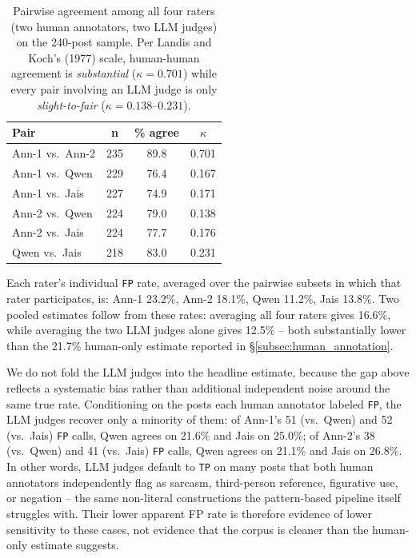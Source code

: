 \documentclass[letterpaper]{article} %
\begin{document}
\begin{table}[h]
\centering
\small
\begin{tabular}{lccc}
\toprule
\textbf{Pair} & \textbf{n} & \textbf{\% agree} & \textbf{$\kappa$} \\
\midrule
Ann-1 vs.\ Ann-2 & 235 & 89.8 & 0.701 \\
Ann-1 vs.\ Qwen & 229 & 76.4 & 0.167 \\
Ann-1 vs.\ Jais & 227 & 74.9 & 0.171 \\
Ann-2 vs.\ Qwen & 224 & 79.0 & 0.138 \\
Ann-2 vs.\ Jais & 224 & 77.7 & 0.176 \\
Qwen vs.\ Jais & 218 & 83.0 & 0.231 \\
\bottomrule
\end{tabular}
\caption{Pairwise agreement among all four raters (two human
annotators, two LLM judges) on the 240-post sample. Per Landis and
Koch's (1977) scale, human-human agreement is \emph{substantial}
($\kappa=0.701$) while every pair involving an LLM judge is only
\emph{slight-to-fair} ($\kappa = 0.138$--$0.231$).}
\label{tab:iaa_full}
\end{table}

Each rater's individual \texttt{FP} rate, averaged over the pairwise
subsets in which that rater participates, is: Ann-1 23.2\%, Ann-2 18.1\%,
Qwen 11.2\%, Jais 13.8\%. Two pooled estimates follow from these rates:
averaging all four raters gives 16.6\%, while averaging the two LLM
judges alone gives 12.5\% -- both substantially lower than the
21.7\% human-only estimate reported in
\S\ref{subsec:human_annotation}.

We do not fold the LLM judges into the headline estimate, because the
gap above reflects a systematic bias rather than additional independent
noise around the same true rate. Conditioning on the posts each human
annotator labeled \texttt{FP}, the LLM judges recover only a minority
of them: of Ann-1's 51 (vs.\ Qwen) and 52 (vs.\ Jais) \texttt{FP} calls,
Qwen agrees on 21.6\% and Jais on 25.0\%; of Ann-2's 38 (vs.\ Qwen) and
41 (vs.\ Jais) \texttt{FP} calls, Qwen agrees on 21.1\% and Jais on
26.8\%. In other words, LLM judges default to \texttt{TP} on many posts
that both human annotators independently flag as sarcasm, third-person
reference, figurative use, or negation -- the same non-literal
constructions the pattern-based pipeline itself struggles with. Their
lower apparent FP rate is therefore evidence of lower sensitivity to
these cases, not evidence that the corpus is cleaner than the
human-only estimate suggests.
\end{document}
